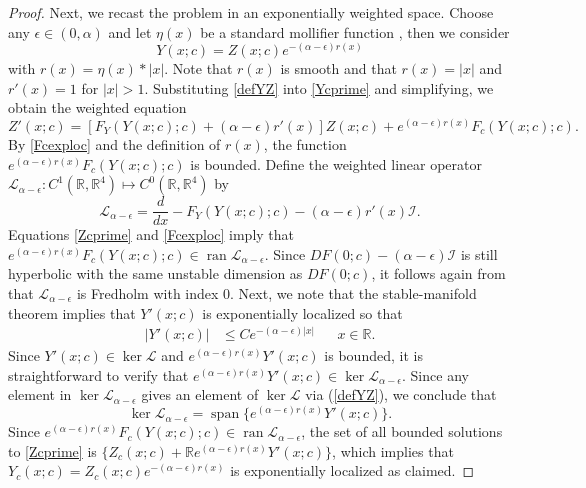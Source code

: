 \documentclass[review,onefignum,onetabnum]{siamart171218}
\newcommand{\R}{\mathbb{R}}
\def\ker{\mathop\mathrm{ker}\nolimits}
\def\Ran{\mathop\mathrm{ran}\nolimits}
\def\Span{\mathop\mathrm{span}\nolimits}
\newcommand{\calI}{\mathcal{I}}
\newcommand{\calL}{\mathcal{L}}
\begin{document}
\begin{lemma}
\begin{proof}
Next, we recast the problem in an exponentially weighted space. Choose any $\epsilon \in (0,\alpha)$ and let $\eta(x)$ be a standard mollifier function \cite[Section~C.5]{Evans2010}, then we consider
\begin{equation}\label{defYZ}
Y(x; c) = Z(x; c) e^{-(\alpha - \epsilon)r(x)}
\end{equation}
with $r(x) = \eta(x) * |x|$. Note that $r(x)$ is smooth and that $r(x) = |x|$ and $r'(x) = 1$ for $|x| > 1$. Substituting \cref{defYZ} into \cref{Ycprime} and simplifying, we obtain the weighted equation
\begin{equation}\label{Zcprime}
Z'(x; c) = [F_Y(Y(x;c); c) + (\alpha - \epsilon) r'(x) ] Z(x; c) + e^{(\alpha - \epsilon)r(x)} F_c(Y(x;c); c).
\end{equation}
By \cref{Fcexploc} and the definition of $r(x)$, the function $e^{(\alpha - \epsilon)r(x)} F_c(Y(x;c); c)$ is bounded. Define the weighted linear operator $\calL_{\alpha - \epsilon}: C^1(\R, \R^4) \mapsto C^0(\R, \R^4)$ by
\begin{equation}\label{suspdefLalpha}
\calL_{\alpha - \epsilon} = \frac{d}{dx} - F_Y(Y(x;c); c) - (\alpha - \epsilon) r'(x) \calI.
\end{equation}
Equations \cref{Zcprime} and \cref{Fcexploc} imply that $e^{(\alpha - \epsilon)r(x)} F_c(Y(x;c); c) \in \Ran \calL_{\alpha - \epsilon}$. Since $DF(0; c)-(\alpha-\epsilon)\calI$ is still hyperbolic with the same unstable dimension as $DF(0; c)$, it follows again from \cite[Lemma 4.2]{Palmer1984} that $\calL_{\alpha - \epsilon}$ is Fredholm with index 0. Next, we note that the stable-manifold theorem implies that $Y'(x; c)$ is exponentially localized so that
\begin{align}\label{Yprimeloc}
|Y'(x; c)| &\leq C e^{-(\alpha - \epsilon)|x|} && x \in \R.
\end{align}
Since $Y'(x; c) \in \ker \calL$ and $e^{(\alpha - \epsilon)r(x)} Y'(x; c)$ is bounded, it is straightforward to verify that $e^{(\alpha - \epsilon)r(x)} Y'(x; c) \in \ker \calL_{\alpha - \epsilon}$. Since any element in $\ker \calL_{\alpha - \epsilon}$ gives an element of $\ker \calL$ via (\ref{defYZ}), we conclude that
\[
\ker \calL_{\alpha - \epsilon} = \Span\{ e^{(\alpha - \epsilon)r(x)} Y'(x; c)\}.
\]
Since $e^{(\alpha - \epsilon)r(x)} F_c(Y(x;c); c) \in \Ran \calL_{\alpha - \epsilon}$, the set of all bounded solutions to \cref{Zcprime} is $\{Z_c(x; c) + \R e^{(\alpha - \epsilon)r(x)} Y'(x;c)\}$, which implies that $Y_c(x; c) = Z_c(x; c) e^{-(\alpha - \epsilon)r(x)}$ is exponentially localized as claimed.
\end{proof}
\end{lemma}
\end{document}
